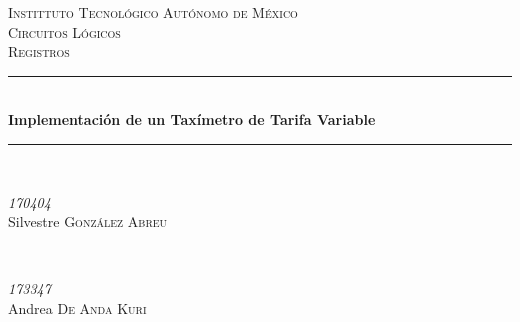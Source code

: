 \documentclass[a4paper,11pt]{article}
\begin{document}
\begin{titlepage} %
	\newcommand{\HRule}{\rule{\linewidth}{0.5mm}} %
	
	\center %
	
	
	\textsc{\LARGE Instittuto Tecnológico Autónomo de México}\\[1.5cm] %
	
	\textsc{\Large Circuitos Lógicos}\\[0.5cm] %
	
	\textsc{\large Registros}\\[0.5cm] %
	
	
	\HRule\\[0.4cm]
	
	{\huge\bfseries Implementación de un Taxímetro de Tarifa Variable}\\[0.4cm] %
	
	\HRule\\[1.5cm]
	
	
	\begin{minipage}{0.4\textwidth}
		\begin{flushleft}
			\large
			\textit{170404}\\
			Silvestre \textsc{González Abreu} %
		\end{flushleft}
	\end{minipage}
	~
	\begin{minipage}{0.4\textwidth}
		\begin{flushright}
			\large
			\textit{173347}\\
			Andrea \textsc{De Anda Kuri} %
		\end{flushright}
	\end{minipage}
	
	

\end{titlepage}
\end{document}
